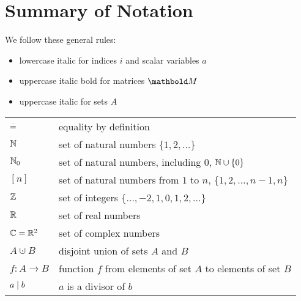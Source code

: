 
\chapter{Summary of Notation}

\begin{fullwidth}
We follow these general rules: \begin{itemize}[noitemsep]
    \item lowercase italic for indices $i$ and scalar variables $a$
    \item uppercase italic bold for matrices $\mM$
    \item uppercase italic for sets $A$
\end{itemize}

\emptyparagraph\begin{longtable}{p{2cm}l}
    $\overset{.}{=}$ & equality by definition \\
    $\mathbb{N}$ & set of natural numbers $\{1, 2, \dots\}$ \\
    $\mathbb{N}_0$ & set of natural numbers, including $0$, $\mathbb{N} \cup \{0\}$ \\
    $[n]$ & set of natural numbers from $1$ to $n$, $\{1, 2, \dots, n-1, n\}$ \\
    $\mathbb{Z}$ & set of integers $\{\dots, -2, 1, 0, 1, 2, \dots\}$ \\
    $\mathbb{R}$ & set of real numbers \\
    $\mathbb{C} = \mathbb{R}^2$ & set of complex numbers \\
    $A \cupdot B$ & disjoint union of sets $A$ and $B$ \\
    $f : A \to B$ & function $f$ from elements of set $A$ to elements of set $B$ \\
    $a \mid b$ & $a$ is a divisor of $b$ \\
\end{longtable}


\end{fullwidth}
